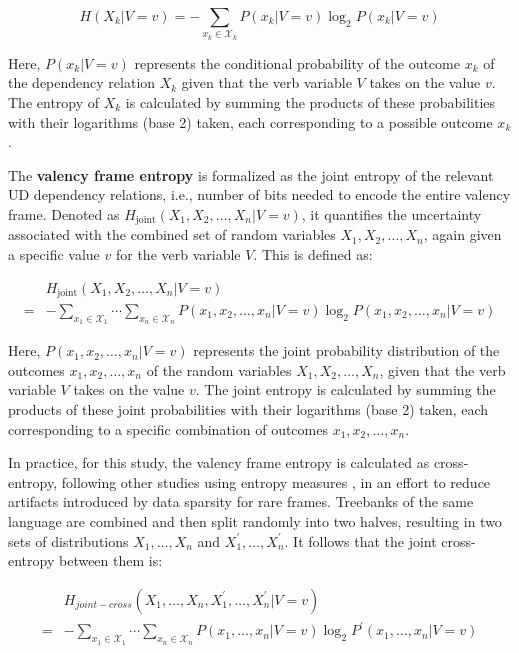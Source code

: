 \begin{equation*}
  H(X_{k}|V=v)=
  -\sum\limits_{x_{k}\in{}\mathcal{X}_{k}}{P(x_{k}|V=v)\log_{2}{P(x_{k}|V=v)}}  
\end{equation*}

Here, $P(x_k | V = v)$ represents the conditional probability of the outcome $x_k$ of the dependency relation $X_k$ given that the verb variable $V$ takes on the value $v$. The entropy of $X_k$ is calculated by summing the products of these probabilities with their logarithms (base 2) taken, each corresponding to a possible outcome $x_k$.

The \textbf{valency frame entropy} is formalized as the joint entropy of the relevant UD dependency relations, i.e., number of bits needed to encode the entire valency frame. Denoted as $H_{\text{joint}}(X_1, X_2, \ldots, X_n | V = v)$, it quantifies the uncertainty associated with the combined set of random variables $X_1, X_2, \ldots, X_n$, again given a specific value $v$ for the verb variable $V$. This is defined as:

\begin{equation*}
\begin{split}
 & H_{\text{joint}}(X_1, X_2, \ldots, X_n | V=v) \\
=& -\sum\limits_{x_1\in{}\mathcal{X}_1}\cdots\sum\limits_{x_n\in{}\mathcal{X}_n}{P(x_1, x_2, \ldots,x_{n}|V=v)\log_2P(x_1, x_2, \ldots,x_n|V=v)}
\end{split}
\end{equation*}

Here, $P(x_1, x_2, \ldots, x_n | V = v)$ represents the joint probability distribution of the outcomes $x_1, x_2, \ldots, x_n$ of the random variables $X_1, X_2, \ldots, X_n$, given that the verb variable $V$ takes on the value $v$. The joint entropy is calculated by summing the products of these joint probabilities with their logarithms (base 2) taken, each corresponding to a specific combination of outcomes $x_1, x_2, \ldots, x_n$.

In practice, for this study, the valency frame entropy is calculated as cross-entropy, following other studies using entropy measures \citep{hahn2021}, in an effort to reduce artifacts introduced by data sparsity for rare frames. Treebanks of the same language are combined and then split randomly into two halves, resulting in two sets of distributions $X_1,\ldots,X_n$ and $X_1^{\prime},\ldots,X_n^{\prime}$. It follows that the joint cross-entropy between them is:

\begin{equation*}
  \begin{split}
   & H_{joint-cross}(X_{1},\ldots,X_{n},X_{1}^{\prime},\ldots,X_{n}^{\prime}|V=v)\\
  =& -\sum\limits_{x_1\in{}\mathcal{X}_1}\cdots\sum\limits_{x_n\in{}\mathcal{X}_n}{P(x_1,\ldots,x_{n}|V=v)\log_{2}P^{\prime}(x_1,\ldots,x_n|V=v)}
  \end{split}
\end{equation*}
  

